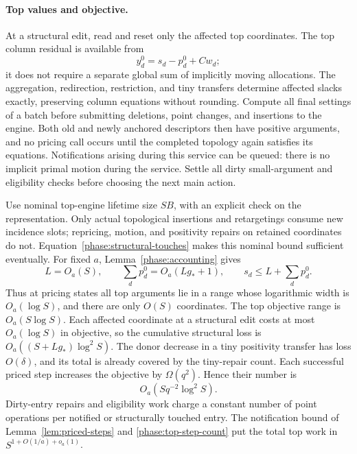\paragraph{Top values and objective.}
At a structural edit, read and reset only the affected top
coordinates.  The top column residual is available from
\[
                         y_d^0=s_d-p_d^0+Cw_d ;
\]
it does not require a separate global sum of implicitly
moving allocations.  The aggregation, redirection,
restriction, and tiny transfers determine affected slacks
exactly, preserving column equations without rounding.
Compute all final settings of a batch before submitting
deletions, point changes, and insertions to the engine.
Both old and newly anchored descriptors then have positive
arguments, and no pricing call occurs until the completed
topology again satisfies its equations.
Notifications arising during this service can be queued:
there is no implicit primal motion during the service.
Settle all dirty small-argument and eligibility checks
before choosing the next main action.

Use nominal top-engine lifetime size \(SB\), with an explicit
check on the representation.  Only actual topological
insertions and retargetings consume new incidence slots;
repricing, motion, and positivity repairs on retained
coordinates do not.  Equation~\eqref{phase:structural-touches}
makes this nominal bound sufficient eventually.
For fixed \(a\), Lemma~\ref{phase:accounting} gives
\[
 L=O_a(S),\qquad
 \sum_d p_d^0=O_a(Lg_*+1),\qquad
                         s_d\le L+\sum_d p_d^0 .
\]
Thus at pricing states all top arguments lie in a range
whose logarithmic width is \(O_a(\log S)\), and there are
only \(O(S)\) coordinates.  The top objective range is
\(O_a(S\log S)\).  Each affected coordinate at a structural
edit costs at most \(O_a(\log S)\) in objective, so the
cumulative structural loss is
\(O_a((S+Lg_*)\log^2 S)\).
The donor decrease in a tiny positivity transfer has loss
\(O(\delta)\), and its total is already covered by the
tiny-repair count.  Each successful priced step increases
the objective by \(\Omega(q^2)\).  Hence their number is
\begin{equation}
\label{phase:top-step-count}
                             O_a(Sq^{-2}\log^2 S).
\end{equation}
Dirty-entry repairs and eligibility work charge a constant
number of point operations per notified or structurally
touched entry.  The notification bound of
Lemma~\ref{lem:priced-steps} and
\eqref{phase:top-step-count} put the total top work in
\(S^{1+O(1/a)+o_a(1)}\).

